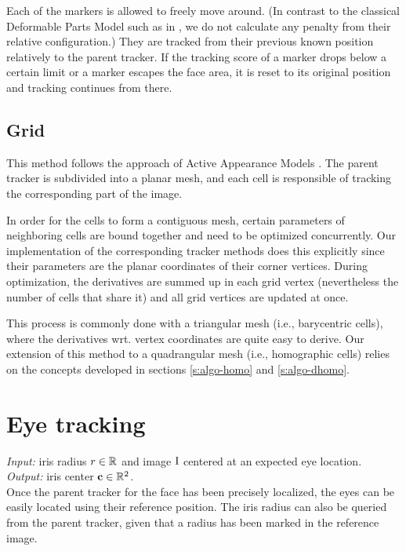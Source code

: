 Each of the markers is allowed to freely move around.
(In contrast to the classical Deformable Parts Model such as in \cite{uricar12}, we do not calculate any penalty from their relative configuration.)
They are tracked from their previous known position relatively to the parent tracker.
If the tracking score of a marker drops below a certain limit or a marker escapes the face area, it is reset to its original position and tracking continues from there.

\subsection{Grid}

This method follows the approach of Active Appearance Models \cite{cootes01}.
The parent tracker is subdivided into a planar mesh, and each cell is responsible of tracking the corresponding part of the image.

In order for the cells to form a contiguous mesh, certain parameters of neighboring cells are bound together and need to be optimized concurrently.
Our implementation of the corresponding tracker methods does this explicitly since their parameters are the planar coordinates of their corner vertices.
During optimization, the derivatives are summed up in each grid vertex (nevertheless the number of cells that share it) and all grid vertices are updated at once.

This process is commonly done with a triangular mesh (i.e., barycentric cells), where the derivatives wrt. vertex coordinates are quite easy to derive.
Our extension of this method to a quadrangular mesh (i.e., homographic cells) relies on the concepts developed in sections \ref{s:algo-homo} and \ref{s:algo-dhomo}.

\section{Eye tracking}

\textit{Input:} iris radius $r \in \mathbb{R}$ and image $\mathrm{I}$ centered at an expected eye location.\\
\textit{Output:} iris center $\mathbf{c} \in \mathbb{R}^2$.\\

Once the parent tracker for the face has been precisely localized, the eyes can be easily located using their reference position.
The iris radius can also be queried from the parent tracker, given that a radius has been marked in the reference image.

